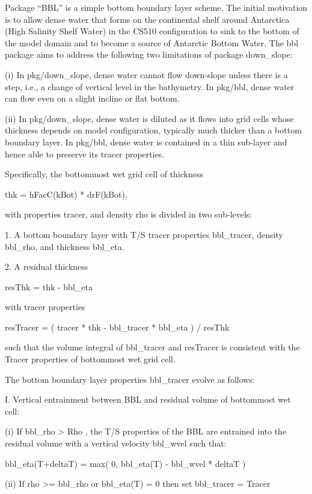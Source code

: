 
Package ``BBL'' is a simple bottom boundary layer scheme.  The initial
motivation is to allow dense water that forms on the continental shelf around
Antarctica (High Salinity Shelf Water) in the CS510 configuration to sink to
the bottom of the model domain and to become a source of Antarctic Bottom
Water.  The bbl package aims to address the following two limitations of
package down_slope:

(i) In pkg/down_slope, dense water cannot flow down-slope unless there is a
step, i.e., a change of vertical level in the bathymetry.  In pkg/bbl, dense
water can flow even on a slight incline or flat bottom.

(ii) In pkg/down_slope, dense water is diluted as it flows into grid cells
whose thickness depends on model configuration, typically much thicker than a
bottom boundary layer.  In pkg/bbl, dense water is contained in a thin
sub-layer and hence able to preserve its tracer properties.

Specifically, the bottommost wet grid cell of thickness

    thk = hFacC(kBot) * drF(kBot),

with properties tracer, and density rho is divided in two sub-levels:

1. A bottom boundary layer with T/S tracer properties bbl_tracer,
density bbl_rho, and thickness bbl_eta.

2. A residual thickness

    resThk = thk - bbl_eta

with tracer properties

    resTracer = ( tracer * thk - bbl_tracer * bbl_eta ) / resThk

such that the volume integral of bbl_tracer and resTracer is consistent with
the Tracer properties of bottommost wet grid cell.

The bottom boundary layer properties bbl_tracer evolve as follows:

I. Vertical entrainment between BBL and residual volume of bottommost wet cell:

(i) If bbl_rho > Rho , the T/S properties of the BBL are entrained into
the residual volume with a vertical velocity bbl_wvel such that:

    bbl_eta(T+deltaT) = max( 0, bbl_eta(T) - bbl_wvel * deltaT )

(ii) If rho >= bbl_rho or bbl_eta(T) = 0 then set bbl_tracer = Tracer

